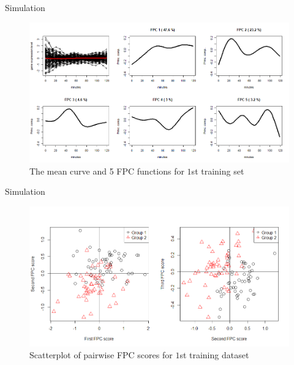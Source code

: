 \documentclass{beamer}
\begin{document}
\begin{frame}{Simulation}
	\begin{figure}[h] %
		\begin{center}
			\includegraphics[width=1\linewidth]{img/1.png}
		\end{center}
		\label{fig:long}
		\label{fig:onecol}
		\caption{The mean curve and 5 FPC functions for $1$st training set}
	\end{figure}
\end{frame}

\begin{frame}{Simulation}
	\begin{figure}[h] %
		\begin{center}
			\includegraphics[width=1\linewidth]{img/3.png}
		\end{center}
		\label{fig:long}
		\label{fig:onecol}
		\caption{Scatterplot of pairwise FPC scores for $1$st training dataset}
	\end{figure}
\end{frame}
\end{document}
